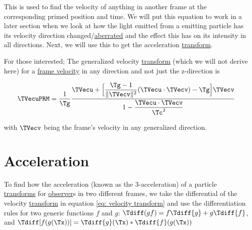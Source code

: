 This is used to find the velocity of anything in another frame at the corresponding primed position and time.
We will put this equation to work in a later section when we look at how the light emitted from a emitting particle has its velocity direction changed/\hyperlink{def-aberration}{aberrated} and the effect this has on its intensity in all directions. Next, we will use this to get the acceleration \hyperlink{def-transform}{transform}.

\sidenote

For those interested; The generalized velocity \hyperlink{def-transform}{transform} (which we will not derive here) for a \hyperlink{def-frame-velocity}{frame velocity} in any direction and not just the z-direction is

\begin{equation}
	\TVecuPRM  = \dfrac{1}{ \Tg  } \dfrac{\TVecu  + \Big[\dfrac{ {\Tg }-1}{\|\TVecv \|^2}(\TVecu \cdot \TVecv )-{\Tg } \Big] \TVecv  }{1-\dfrac{\TVecu \cdot\TVecv  }{ \Tc ^2} }
\end{equation}

with ${\TVecv  }$ being the frame's velocity in any generalized direction.

\section{Acceleration} \label{sect: Acceleration}

To find how the acceleration (known as the 3-acceleration) of a particle \hyperlink{def-transform}{transforms} for \hyperlink{def-observer}{observer}s in two different frames, we take the differential of the velocity \hyperlink{def-transform}{transform} in equation \eqref{eq: velocity transform} and use the differentiation rules for two generic functions ${f}$ and ${g}$: ${\Tdiff ({g}{f})} = {f} {\Tdiff {g}} + {g} {\Tdiff {f}}$, and ${\Tdiff [{ {f}({g}(\Tx ))}]} = { {\Tdiff {g}}(\Tx )} * {\Tdiff {f}({ {g}(\Tx )})}$

